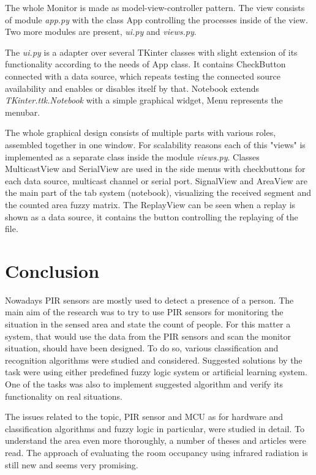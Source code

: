 The whole Monitor is made as model-view-controller pattern. The view consists of module {\it app.py} with
the class App controlling the processes inside of the view. Two more modules are present, {\it ui.py}
and {\it views.py}.

The {\it ui.py} is a adapter over several TKinter classes with slight extension of its functionality according
to the needs of App class. It contains CheckButton connected with a data source, which repeats testing the 
connected source availability and enables or disables itself by that. Notebook extends {\it TKinter.ttk.Notebook}
with a simple graphical widget, Menu represents the menubar.

The whole graphical design consists of multiple parts with various roles, assembled together in one window.
For scalability reasons each of this "views" is implemented as a separate class inside the module {\it views.py}.
Classes MulticastView and SerialView are used in the side menus with checkbuttons for each data source, multicast
channel or serial port. SignalView and AreaView are the main part of the tab system (notebook), visualizing the
received segment and the counted area fuzzy matrix. The ReplayView can be seen when a replay is shown as a data
source, it contains the button controlling the replaying of the file.






\chapter{Conclusion}

Nowadays PIR sensors are mostly used to detect a presence of a person. The main aim of the research was to try to use PIR sensors
for monitoring the situation in the sensed area and state the count of people. For this matter a system, that would use the data
from the PIR sensors and scan the monitor situation, should have been designed. To do so, various classification and recognition
algorithms were studied and considered. Suggested solutions by the task were using either predefined fuzzy logic system or
artificial learning system. One of the tasks was also to implement suggested algorithm and verify its functionality on real situations.

The issues related to the topic, PIR sensor and MCU as for hardware and classification algorithms and fuzzy logic in particular, were
studied in detail. To understand the area even more thoroughly, a number of theses and articles were read. The approach of evaluating
the room occupancy using infrared radiation is still new and seems very promising.

